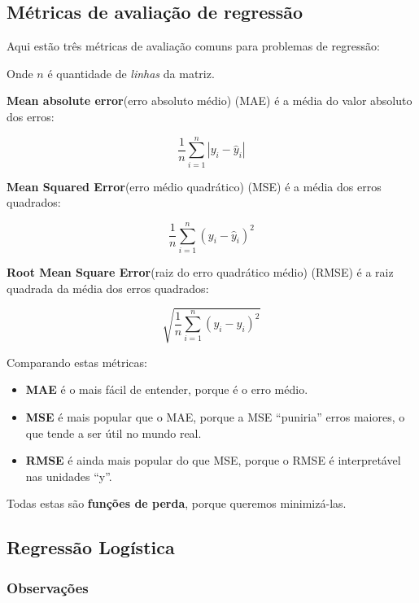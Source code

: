 \documentclass[12pt]{article}
\providecommand{\tightlist}{%
\setlength{\itemsep}{0pt}\setlength{\parskip}{0pt}}
\begin{document}
    \hypertarget{muxe9tricas-de-avaliauxe7uxe3o-de-regressuxe3o}{%
\subsection{Métricas de avaliação de
regressão}\label{muxe9tricas-de-avaliauxe7uxe3o-de-regressuxe3o}}

Aqui estão três métricas de avaliação comuns para problemas de
regressão:

Onde \(n\) é quantidade de \emph{linhas} da matriz.

\textbf{Mean absolute error}(erro absoluto médio) (MAE) é a média do
valor absoluto dos erros:

\[\frac 1n\sum_{i=1}^n|y_i-\hat{y}_i|\]

\textbf{Mean Squared Error}(erro médio quadrático) (MSE) é a média dos
erros quadrados:

\[\frac 1n\sum_{i=1}^n(y_i-\hat{y}_i)^2\]

\textbf{Root Mean Square Error}(raiz do erro quadrático médio) (RMSE) é
a raiz quadrada da média dos erros quadrados:

\[\sqrt{\frac 1n\sum_{i=1}^n(y_i-\hat{y}_i)^2}\]

Comparando estas métricas:

\begin{itemize}
\tightlist
\item
  \textbf{MAE} é o mais fácil de entender, porque é o erro médio.
\item
  \textbf{MSE} é mais popular que o MAE, porque a MSE ``puniria'' erros
  maiores, o que tende a ser útil no mundo real.
\item
  \textbf{RMSE} é ainda mais popular do que MSE, porque o RMSE é
  interpretável nas unidades ``y''.
\end{itemize}

Todas estas são \textbf{funções de perda}, porque queremos minimizá-las.

\hypertarget{regressuxe3o-loguxedstica}{%
\subsection{\texorpdfstring{\textbf{Regressão
Logística}}{Regressão Logística}}\label{regressuxe3o-loguxedstica}}

\hypertarget{observauxe7uxf5es}{%
\subsubsection{Observações}\label{observauxe7uxf5es}}
\end{document}
